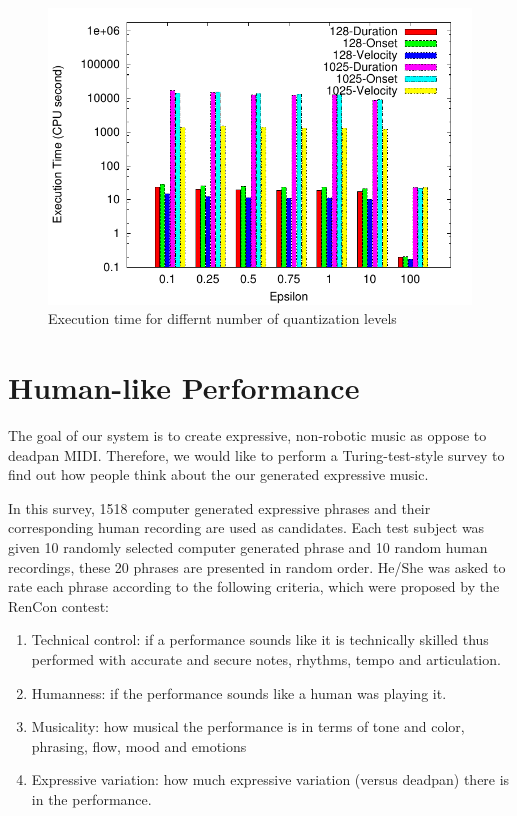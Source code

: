 \begin{figure}[tp]
   \begin{center}
      \includegraphics[width=\textwidth]{fig/quant_comp}
   \end{center}
   \caption{Execution time for differnt number of quantization levels}
   \label{fig:quant_comp}
\end{figure}

\section{Human-like Performance}
\label{sec:turing}
The goal of our system is to create expressive, non-robotic music as oppose to deadpan MIDI. Therefore, we would like to perform a Turing-test-style survey to find out how people think about the our generated expressive music.

In this survey, 1518 computer generated expressive phrases and their corresponding human recording are used as candidates. Each test subject was given 10 randomly selected computer generated phrase and 10 random human recordings, these 20 phrases are presented in random order. He/She was asked to rate each phrase according to the following criteria, which were proposed by the RenCon contest\cite{rencon}:
\begin{enumerate}
   \item Technical control: if a performance sounds like it is technically skilled thus performed with accurate and secure notes, rhythms, tempo and articulation.
   \item  Humanness: if the performance sounds like a human was playing it.
   \item  Musicality: how musical the performance is in terms of tone and color, phrasing, flow, mood and emotions
   \item Expressive variation: how much expressive variation (versus deadpan) there is in the performance.
\end{enumerate}

